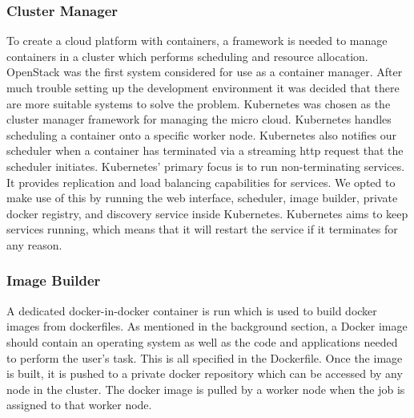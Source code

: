 \documentclass{sig-alternate-05-2015}
\begin{document}
\subsubsection{Cluster Manager}
To create a cloud platform with containers, a framework is needed to manage containers in a cluster which performs scheduling and resource allocation. OpenStack was the first system considered for use as a container manager. After much trouble setting up the development environment it was decided that there are more suitable systems to solve the problem. Kubernetes was chosen as the cluster manager framework for managing the micro cloud. Kubernetes handles scheduling a container onto a specific worker node. Kubernetes also notifies our scheduler when a container has terminated via a streaming http request that the scheduler initiates. Kubernetes' primary focus is to run non-terminating services. It provides replication and load balancing capabilities for services. We opted to make use of this by running the web interface, scheduler, image builder, private docker registry, and discovery service inside Kubernetes. Kubernetes aims to keep services running, which means that it will restart the service if it terminates for any reason.

\subsubsection{Image Builder}
A dedicated docker-in-docker container is run which is used to build docker images from dockerfiles. As mentioned in the background section, a Docker image should contain an operating system as well as the code and applications needed to perform the user's task. This is all specified in the Dockerfile. Once the image is built, it is pushed to a private docker repository which can be accessed by any node in the cluster. The docker image is pulled by a worker node when the job is assigned to that worker node.
\end{document}
